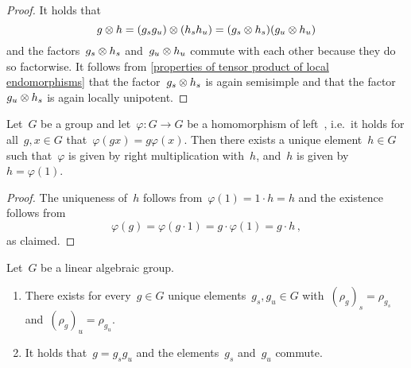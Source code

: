 \begin{proof}
  It holds that
  \[
      g \otimes h
    = (g_s g_u) \otimes (h_s h_u)
    = (g_s \otimes h_s) (g_u \otimes h_u)
  \]
  and the factors~$g_s \otimes h_s$ and~$g_u \otimes h_u$ commute with each other because they do so factorwise.
  It follows from \cref{properties of tensor product of local endomorphisms} that the factor~$g_s \otimes h_s$ is again semisimple and that the factor~$g_u \otimes h_s$ is again locally unipotent.
\end{proof}


\begin{lemma}
  \label{homomorphisms of Gsets}
  Let~$G$ be a group and let~$\varphi \colon G \to G$ be a homomorphism of left~, i.e.\ it holds for all~$g, x \in G$ that~$\varphi(g x) = g \varphi(x)$.
  Then there exists a unique element~$h \in G$ such that~$\varphi$ is given by right multiplication with~$h$, and~$h$ is given by~$h = \varphi(1)$.
\end{lemma}


\begin{proof}
  The uniqueness of~$h$ follows from~$\varphi(1) = 1 \cdot h = h$ and the existence follows from
  \[
      \varphi(g)
    = \varphi(g \cdot 1)
    = g \cdot \varphi(1)
    = g \cdot h \,,
  \]
  as claimed.
\end{proof}


\begin{theorem}
  \label{abstract jcd}
  Let~$G$ be a linear algebraic group.
  \begin{enumerate}
    \item
      There exists for every~$g \in G$ unique elements~$g_s, g_u \in G$ with~$(\rho_g)_s = \rho_{g_s}$ and~$(\rho_g)_u = \rho_{g_u}$.
    \item
      It holds that~$g = g_s g_u$ and the elements~$g_s$ and~$g_u$ commute.
  \end{enumerate}
\end{theorem}


